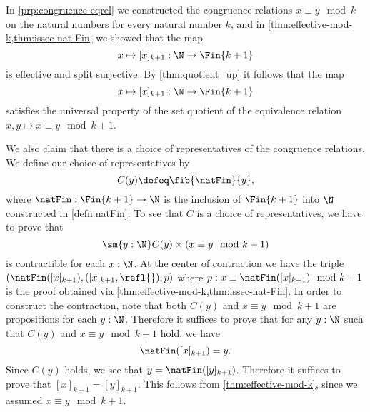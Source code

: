 \begin{eg}
  In \cref{prp:congruence-eqrel} we constructed the congruence relations $x\equiv y \mod k$ on the natural numbers for every natural number $k$, and in \cref{thm:effective-mod-k,thm:issec-nat-Fin} we showed that the map
  \begin{equation*}
    x\mapsto [x]_{k+1}:\N\to\Fin{k+1}
  \end{equation*}
  is effective and split surjective. By \cref{thm:quotient_up} it follows that the map
  \begin{equation*}
    x\mapsto [x]_{k+1}:\N\to\Fin{k+1}
  \end{equation*}
  satisfies the universal property of the set quotient of the equivalence relation $x,y\mapsto x\equiv y\mod k+1$.

  We also claim that there is a choice of representatives of the congruence relations. We define our choice of representatives by
  \begin{equation*}
    C(y)\defeq \fib{\natFin}{y},
  \end{equation*}
  where $\natFin:\Fin{k+1}\to\N$ is the inclusion of $\Fin{k+1}$ into $\N$ constructed in \cref{defn:natFin}. To see that $C$ is a choice of representatives, we have to prove that
  \begin{equation*}
    \sm{y:\N}C(y)\times (x\equiv y\mod k+1)
  \end{equation*}
  is contractible for each $x:\N$. At the center of contraction we have the triple $(\natFin([x]_{k+1}),([x]_{k+1},\refl{}),p)$ where $p:x\equiv\natFin([x]_{k+1})\mod k+1$ is the proof obtained via \cref{thm:effective-mod-k,thm:issec-nat-Fin}. In order to construct the contraction, note that both $C(y)$ and $x\equiv y\mod k+1$ are propositions for each $y:\N$. Therefore it suffices to prove that for any $y:\N$ such that $C(y)$ and $x\equiv y\mod k+1$ hold, we have
  \begin{equation*}
    \natFin([x]_{k+1})=y.
  \end{equation*}
  Since $C(y)$ holds, we see that $y=\natFin([y]_{k+1})$. Therefore it suffices to prove that $[x]_{k+1}=[y]_{k+1}$. This follows from \cref{thm:effective-mod-k}, since we assumed $x\equiv y\mod k+1$.
\end{eg}

